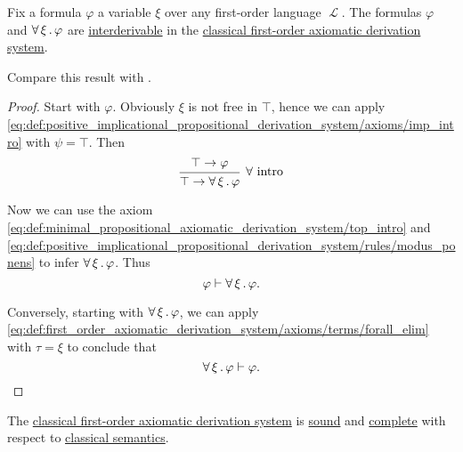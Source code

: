 \begin{proposition}\label{thm:syntactic_implicit_universal_quantification}
  Fix a formula \( \varphi \) a variable \( \xi \) over any first-order language \( \mscrL \). The formulas \( \varphi \) and \( \forall \thinspace \xi \thinspace . \thinspace \varphi \) are \hyperref[def:derivation_system_derivability]{interderivable} in the \hyperref[def:first_order_axiomatic_derivation_system]{classical first-order axiomatic derivation system}.

  Compare this result with .
\end{proposition}
\begin{proof}
  Start with \( \varphi \). Obviously \( \xi \) is not free in \( \top \), hence we can apply \eqref{eq:def:positive_implicational_propositional_derivation_system/axioms/imp_intro} with \( \psi = \top \). Then
  \begin{equation*}
    \begin{prooftree}
      \hypo{\top \rightarrow \varphi}
      \infer1[\( \forall \) intro]{\top \rightarrow \qforall \xi \varphi}
    \end{prooftree}
  \end{equation*}

  Now we can use the axiom \eqref{eq:def:minimal_propositional_axiomatic_derivation_system/top_intro} and \eqref{eq:def:positive_implicational_propositional_derivation_system/rules/modus_ponens} to infer \( \forall \thinspace \xi \thinspace . \thinspace \varphi \). Thus
  \begin{equation*}
    \varphi \vdash \forall \thinspace \xi \thinspace . \thinspace \varphi.
  \end{equation*}

  Conversely, starting with \( \forall \thinspace \xi \thinspace . \thinspace \varphi \), we can apply \eqref{eq:def:first_order_axiomatic_derivation_system/axioms/terms/forall_elim} with \( \tau = \xi \) to conclude that
  \begin{equation*}
    \forall \thinspace \xi \thinspace . \thinspace \varphi \vdash \varphi.
  \end{equation*}
\end{proof}

\begin{theorem}\label{thm:classical_first_order_logic_is_sound_and_complete}
  The \hyperref[def:first_order_axiomatic_derivation_system]{classical first-order axiomatic derivation system} is \hyperref[def:derivability_and_satisfiability/soundness]{sound} and \hyperref[def:derivability_and_satisfiability/completeness]{complete} with respect to \hyperref[def:first_order_semantics]{classical semantics}.
\end{theorem}


